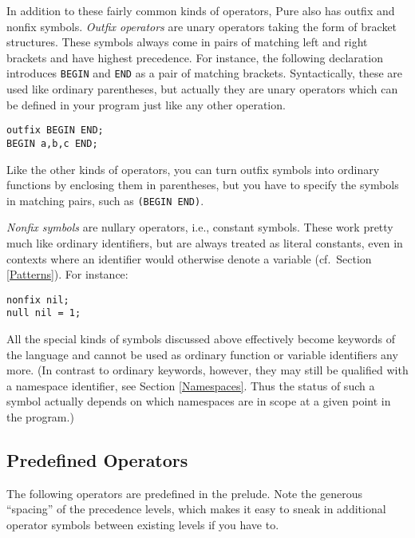 \documentclass[a4paper,12pt]{article}
\begin{document}
In addition to these fairly common kinds of operators, Pure also has outfix and nonfix symbols. \emph{Outfix operators} are unary operators taking the form of bracket structures. These symbols always come in pairs of matching left and right brackets and have highest precedence. For instance, the following declaration introduces \verb|BEGIN| and \verb|END| as a pair of matching brackets. Syntactically, these are used like ordinary parentheses, but actually they are unary operators which can be defined in your program just like any other operation.

\begin{lstlisting}
outfix BEGIN END;
BEGIN a,b,c END;
\end{lstlisting}

Like the other kinds of operators, you can turn outfix symbols into ordinary functions by enclosing them in parentheses, but you have to specify the
symbols in matching pairs, such as \verb|(BEGIN END)|.

\emph{Nonfix symbols} are nullary operators, i.e., constant symbols. These work pretty much like ordinary identifiers, but are always treated as literal constants, even in contexts where an identifier would otherwise denote a variable (cf.\ Section \ref{Patterns}). For instance:

\begin{lstlisting}
nonfix nil;
null nil = 1;
\end{lstlisting}

All the special kinds of symbols discussed above effectively become keywords of the language and cannot be used as ordinary function or variable identifiers any more. (In contrast to ordinary keywords, however, they may still be qualified with a namespace identifier, see Section \ref{Namespaces}. Thus the status of such a symbol actually depends on which namespaces are in scope at a given point in the program.)

\subsection{Predefined Operators}
\label{Predefined Operators}

The following operators are predefined in the prelude. Note the generous ``spacing'' of the precedence levels, which makes it easy to sneak in additional operator symbols between existing levels if you have to.
\end{document}
